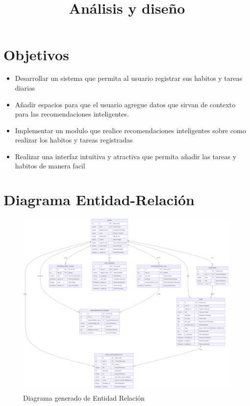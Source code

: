 \documentclass{pretexto/report}
\title{Análisis y diseño}
\begin{document}

                                                     

\tableofcontents 
\pagebreak



\pagebreak


\section{Objetivos}

\begin{itemize}
    \item Desarrollar un sistema que permita al usuario registrar sus habitos y tareas diarias
    \item Añadir espacios para que el usuario agregue datos que sirvan de contexto para las recomendaciones inteligentes.
    \item Implementar un modulo que realice recomendaciones inteligentes sobre como realizar los habitos y tareas registradas
    \item Realizar una interfaz intuitiva y atractiva que permita añadir las tareas y habitos de manera facil
\end{itemize}


\section{Diagrama Entidad-Relación}
\begin{figure}[H]
    \centering
    \includegraphics[width=\linewidth]{pngs/relacional.png}
    \caption{Diagrama generado de Entidad Relación}
\end{figure}
\end{document}
